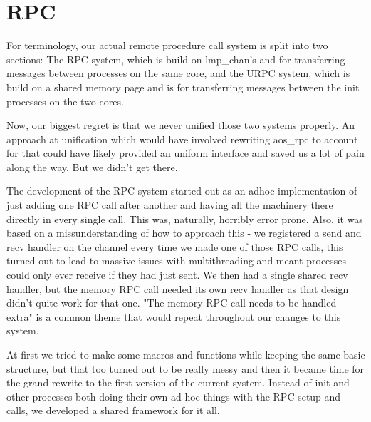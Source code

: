 \section{RPC}\label{s:RPC}

For terminology, our actual remote procedure call system is split into two 
sections:
The RPC system, which is build on lmp\_chan's and for transferring messages 
between processes on the same core, and the URPC system, which is build on a 
shared memory page and is for transferring messages between the init processes 
on the two cores.
\medskip

Now, our biggest regret is that we never unified those two systems properly. 
An approach at unification which would have involved rewriting aos\_rpc to 
account for that could have likely provided an uniform interface and saved us 
a lot of pain along the way. But we didn't get there.
\medskip

The development of the RPC system started out as an adhoc implementation of 
just adding one RPC call after another and having all the machinery there 
directly in every single call. This was, naturally, horribly error prone. 
Also, it was based on a missunderstanding of how to approach this - we 
registered a send and recv handler on the channel every time we made one of 
those RPC calls, this turned out to lead to massive issues with multithreading 
and meant processes could only ever receive if they had just sent. We then had 
a single shared recv handler, but the memory RPC call needed its own recv 
handler as that design didn't quite work for that one. "The memory RPC call 
needs to be handled extra" is a common theme that would repeat throughout our 
changes to this system.
\medskip

At first we tried to make some macros and functions while keeping the same 
basic structure, but that too turned out to be really messy and then it 
became time for the grand rewrite to the first version of the current system. 
Instead of init and other processes both doing their own ad-hoc things with 
the RPC setup and calls, we developed a shared framework for it all.
\medskip


